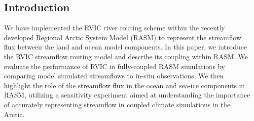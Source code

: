 \documentclass[jgrga, draft]{agutex}
\begin{document}
%

\begin{article}

%
%

\section{Introduction}

We have implemented the RVIC river routing scheme within the recently developed Regional Arctic System Model (RASM) \citep{Hamman_2016} to represent the streamflow flux between the land and ocean model components.
In this paper, we introduce the RVIC streamflow routing model and describe its coupling within RASM.
We evaluate the performance of RVIC in fully-coupled RASM simulations by comparing model simulated streamflows to in-situ observations.
We then highlight the role of the streamflow flux in the ocean and sea-ice components in RASM, utilizing a sensitivity experiment aimed at understanding the importance of accurately representing streamflow in coupled climate simulations in the Arctic.


\end{article}
\end{document}
